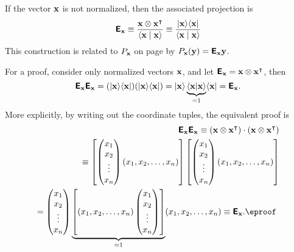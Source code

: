 If the vector ${\bf x}$ is not normalized,
then the associated projection is
\begin{equation}
\textsf{\textbf{E}}_{\bf x} \equiv \frac{{\bf x} \otimes {\bf x}^\intercal }{\langle {\bf x}\mid {\bf x}\rangle}
\equiv \frac{\vert{\bf x}\rangle \langle {\bf x}\vert}{\langle {\bf x}\mid {\bf x}\rangle}
\end{equation}
This construction is related to
$P_{\bf x}$ on page \pageref{2011-m-gsp}
by $P_{\bf x}({\bf y})=\textsf{\textbf{E}}_{\bf x}{\bf y}$.

{\color{OliveGreen}
\bproof
For a proof, consider only normalized vectors ${\bf x}$, and
let $\textsf{\textbf{E}}_{\bf x} = {\bf x}\otimes {\bf x}^\intercal  $,
then
$$
\textsf{\textbf{E}}_{\bf x}\textsf{\textbf{E}}_{\bf x}
=
(\vert{\bf x}\rangle \langle {\bf x}\vert)
(\vert{\bf x}\rangle \langle {\bf x}\vert)
=
\vert{\bf x}\rangle \underbrace{\langle {\bf x}\vert {\bf x}\rangle}_{=1} \langle {\bf x}\vert
=  \textsf{\textbf{E}}_{\bf x}.
$$
More explicitly, by writing out the coordinate tuples, the equivalent proof is
\begin{equation}
\begin{split}
\textsf{\textbf{E}}_{\bf x}\textsf{\textbf{E}}_{\bf x}
\equiv ({\bf x}\otimes {\bf x}^\intercal  ) \cdot ({\bf x}\otimes {\bf x}^\intercal  )
\\
\equiv
\left[
\begin{pmatrix}
x_1\\
x_2\\
\vdots \\
x_n
\end{pmatrix}
(x_1,x_2,\ldots ,x_n)
\right]
\left[
\begin{pmatrix}
x_1\\
x_2\\
\vdots \\
x_n
\end{pmatrix}
(x_1,x_2,\ldots ,x_n)
 \right]
\\
=
\begin{pmatrix}
x_1\\
x_2\\
\vdots \\
x_n
\end{pmatrix}
\underbrace{\left[ (x_1,x_2,\ldots ,x_n)
\begin{pmatrix}
x_1\\
x_2\\
\vdots \\
x_n
\end{pmatrix}
\right]}_{=1}
(x_1,x_2,\ldots ,x_n)
\equiv\textsf{\textbf{E}}_{\bf x}. \textrm{\eproof }
\end{split}
\end{equation}
}

